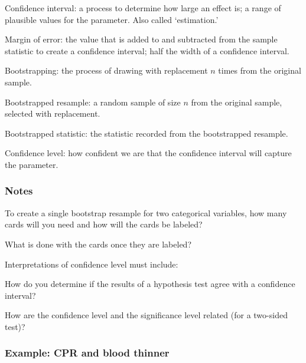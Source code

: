\documentclass[
]{report}
\newcommand{\rgs}{\vspace{12pt}} %
\begin{document}
Confidence interval: a process to determine how large an effect is; a range of plausible values for the parameter. Also called `estimation.'

Margin of error: the value that is added to and subtracted from the sample statistic to create a confidence interval; half the width of a confidence interval.

Bootstrapping: the process of drawing with replacement \(n\) times from the original sample.

Bootstrapped resample: a random sample of size \(n\) from the original sample, selected with replacement.

Bootstrapped statistic: the statistic recorded from the bootstrapped resample.

Confidence level: how confident we are that the confidence interval will capture the parameter.

\hypertarget{notes-20}{%
\subsubsection*{Notes}\label{notes-20}}

To create a single bootstrap resample for two categorical variables, how many cards will you need and how will the cards be labeled?
\rgs

What is done with the cards once they are labeled?
\rgs

Interpretations of confidence level must include:
\rgs
\rgs

How do you determine if the results of a hypothesis test agree with a confidence interval?
\rgs
\rgs

How are the confidence level and the significance level related (for a two-sided test)?
\rgs

\hypertarget{example-cpr-and-blood-thinner-1}{%
\subsubsection*{Example: CPR and blood thinner}\label{example-cpr-and-blood-thinner-1}}
\end{document}
